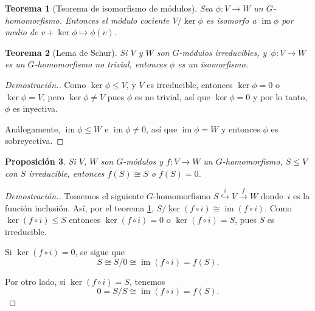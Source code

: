 \documentclass[12pt]{book}
\newtheorem{theorem}{Teorema}[section]
\newtheorem{proposition}[theorem]{Proposición}
\theoremstyle{definition}
\DeclareMathOperator{\im}{im}
\newcounter{in}
\begin{document}
\begin{theorem}[Teorema de isomorfismo de módulos]
  \label{teorema-isomorfismo-mod}
  Sea $\phi:V\rightarrow W$ un $G$-homomorfismo. Entonces el
  módulo cociente $V/\ker\phi$ es isomorfo a $\im\phi$ por medio de
  $v+\ker\phi\mapsto\phi(v)$.
\end{theorem}

\begin{theorem}[Lema de Schur]
  \label{lema-schur}
  Si $V$ y $W$ son $G$-módulos irreducibles, y~$\phi:V\rightarrow W$
  es un $G$-homomorfismo no trivial, entonces $\phi$ es un isomorfismo.
\end{theorem}

\begin{proof}[Demostración.]
  Como $\ker \phi\leq V$, y $V$ es irreducible, entonces $\ker \phi=0$
  o~$\ker\phi=V$, pero  $\ker\phi\neq V$ pues $\phi$ es no trivial,
  así que $\ker \phi=0$ y por lo tanto, $\phi$ es inyectiva. 

  Análogamente, $\im\phi\leq W$ e $\im \phi\neq 0$, así que $\im
  \phi=W$ y entonces $\phi$ es sobreyectiva.
\end{proof}

\begin{proposition}
  \label{im-mod-irreducible}
  Si $V$, $W$ son $G$-módulos y $f:V\rightarrow W$ un
  $G$-homomorfismo, $S\leq V$ con $S$ irreducible, entonces $f(S)\cong
  S$ o $f(S)=0$.
\end{proposition}

\begin{proof}[Demostración.]
  Tomemos el siguiente $G$-homomorfismo
  $S\stackrel{i}{\hookrightarrow} V\stackrel{f}{\rightarrow}W$
  donde~$i$ es la función inclusión. Así, por el teorema \ref{teorema-isomorfismo-mod}, $S/\ker(f\circ
  i)\cong\im(f\circ i)$. Como $\ker(f\circ
  i)\leq S$ entonces $\ker(f\circ i)=0$ o $\ker(f\circ i)=S$, pues $S$
  es irreducible.

  Si $\ker(f\circ i)=0$, se sigue que
  $$S\cong S/0\cong\im(f\circ i)=f(S).$$

  Por otro lado, si $\ker(f\circ i)=S$, tenemos
  $$0=S/S\cong\im(f\circ i)=f(S).$$
\end{proof}
\end{document}

